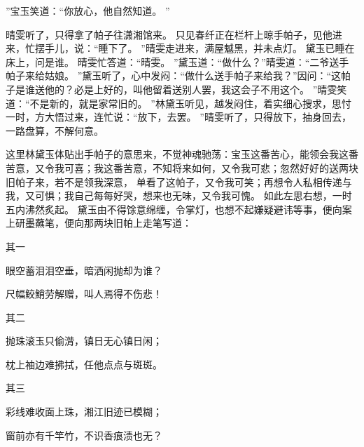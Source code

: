 ”宝玉笑道：“你放心，他自然知道。
”\par
晴雯听了，只得拿了帕子往潇湘馆来。
只见春纤正在栏杆上晾手帕子，见他进来，忙摆手儿，说：“睡下了。
”晴雯走进来，满屋魆黑，并未点灯。
黛玉已睡在床上，问是谁。
晴雯忙答道：“晴雯。
”黛玉道：“做什么？”晴雯道：“二爷送手帕子来给姑娘。
”黛玉听了，心中发闷：“做什么送手帕子来给我？”因问：“这帕子是谁送他的？必是上好的，叫他留着送别人罢，我这会子不用这个。
”晴雯笑道：“不是新的，就是家常旧的。
”林黛玉听见，越发闷住，着实细心搜求，思忖一时，方大悟过来，连忙说：“放下，去罢。
”晴雯听了，只得放下，抽身回去，一路盘算，不解何意。
\par
这里林黛玉体贴出手帕子的意思来，不觉神魂驰荡：宝玉这番苦心，能领会我这番苦意，又令我可喜；我这番苦意，不知将来如何，又令我可悲；忽然好好的送两块旧帕子来，若不是领我深意，
单看了这帕子，又令我可笑；再想令人私相传递与我，又可惧；我自己每每好哭，想来也无味，又令我可愧。
如此左思右想，一时五内沸然炙起。
黛玉由不得馀意绵缠，令掌灯，也想不起嫌疑避讳等事，便向案上研墨蘸笔，便向那两块旧帕上走笔写道：\par
\hop
其一\par
眼空蓄泪泪空垂，暗洒闲抛却为谁？\par
尺幅鲛鮹劳解赠，叫人焉得不伤悲！\par
\hop
其二\par
抛珠滚玉只偷潸，镇日无心镇日闲；\par
枕上袖边难拂拭，任他点点与斑斑。
\par
\hop
其三\par
彩线难收面上珠，湘江旧迹已模糊；\par
窗前亦有千竿竹，不识香痕渍也无？\par
